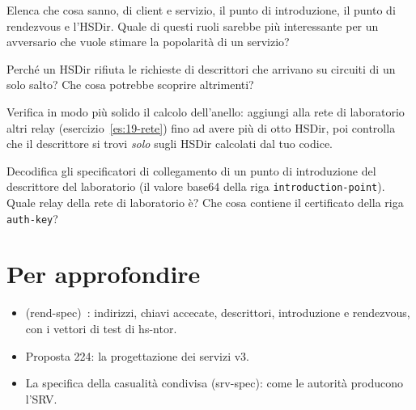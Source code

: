 \begin{esercizio}[2]\label{es:14-ruoli}
Elenca che cosa sanno, di client e servizio, il punto di introduzione, il punto di rendezvous e l'HSDir. Quale di questi ruoli sarebbe più interessante per un avversario che vuole stimare la popolarità di un servizio?
\end{esercizio}

\begin{esercizio}[2]\label{es:14-anonimo}
Perché un HSDir rifiuta le richieste di descrittori che arrivano su circuiti di un solo salto? Che cosa potrebbe scoprire altrimenti?
\end{esercizio}

\begin{esercizio}[3]\label{es:14-anello}
Verifica in modo più solido il calcolo dell'anello: aggiungi alla rete di laboratorio altri relay (esercizio~\ref{es:19-rete}) fino ad avere più di otto HSDir, poi controlla che il descrittore si trovi \emph{solo} sugli HSDir calcolati dal tuo codice.
\end{esercizio}

\begin{esercizio}[3]\label{es:14-ipt}
Decodifica gli specificatori di collegamento di un punto di introduzione del descrittore del laboratorio (il valore base64 della riga \texttt{introduction-point}). Quale relay della rete di laboratorio è? Che cosa contiene il certificato della riga \texttt{auth-key}?
\end{esercizio}

\section*{Per approfondire}
\begin{itemize}
  \item {} (rend-spec)~\cite{torspec}: indirizzi, chiavi accecate, descrittori, introduzione e rendezvous, con i vettori di test di hs-ntor.
  \item Proposta 224: la progettazione dei servizi v3.
  \item La specifica della casualità condivisa (srv-spec): come le autorità producono l'SRV.
\end{itemize}
